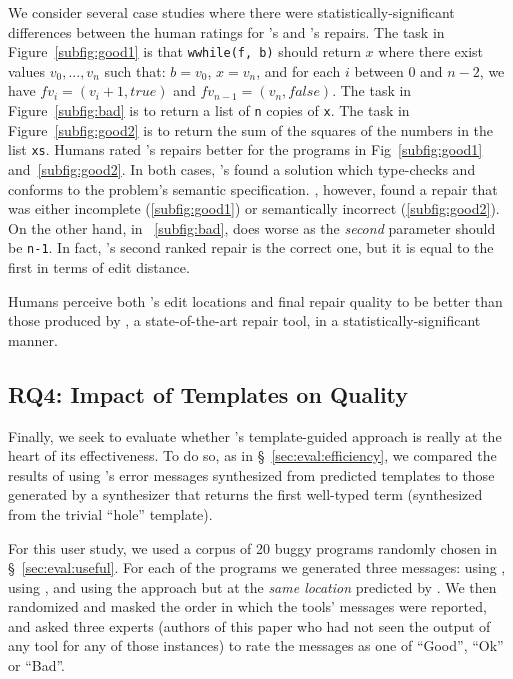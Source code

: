 %
We consider several case studies where there were
statistically-significant differences between
the human ratings for \toolname's and \seminal's
repairs.
%
The task in Figure~\ref{subfig:good1} is that
\texttt{wwhile(f, b)} should return $x$ where
there exist values $v_0,...,v_n$ such that:
$b = v_0$, $x = v_n$, and for each $i$ between
0 and $n-2$, we have $f v_i = (v_i+1, true)$
and $f v_{n-1} = (v_n, false)$.
%
The task in Figure~\ref{subfig:bad} is to
return a list of \texttt{n} copies of \texttt{x}.
%
The task in Figure~\ref{subfig:good2} is to
return the sum of the squares of the numbers
in the list \texttt{xs}.
%
Humans rated \toolname's repairs better
for the programs in Fig~\ref{subfig:good1}
and~\ref{subfig:good2}.
%
In both cases, \toolname's found a solution
which type-checks and conforms to the problem's
semantic specification.
%
\seminal, however, found a repair that was
either incomplete (\ref{subfig:good1}) or
semantically incorrect (\ref{subfig:good2}).
On the other hand, in ~\ref{subfig:bad}, \toolname
does worse as the \emph{second} parameter should
be \verb|n-1|. In fact, \toolname's second ranked
repair is the correct one, but it is equal
to the first in terms of edit distance.

\begin{framed}
\noindent Humans perceive both \toolname's edit locations
 and final repair quality to be better than those produced
 by \seminal, a state-of-the-art \ocaml repair tool, in a
 statistically-significant manner.
\end{framed}

\subsection{RQ4: Impact of Templates on Quality}
\label{sec:eval:template_quality}

Finally, we seek to evaluate whether \toolname's template-guided
approach is really at the heart of its effectiveness. To do so,
as in \S~\ref{sec:eval:efficiency}, we
compared the results of using \toolname's error messages
synthesized from predicted templates to those generated by
a \naive synthesizer that returns the first well-typed term
(\ie synthesized from the trivial ``hole'' template).

%
For this user study, we used a corpus of 20 buggy programs randomly chosen in
\S~\ref{sec:eval:useful}. For each of the programs we generated three messages:
using \toolname, using \seminal, and using the \naive approach but at the
\emph{same location} predicted by \toolname. We then randomized and masked the
order in which the tools' messages were reported, and asked three experts
(authors of this paper who had not seen the output of any tool for any of those
instances) to rate the messages as one of ``Good'', ``Ok'' or ``Bad''.

